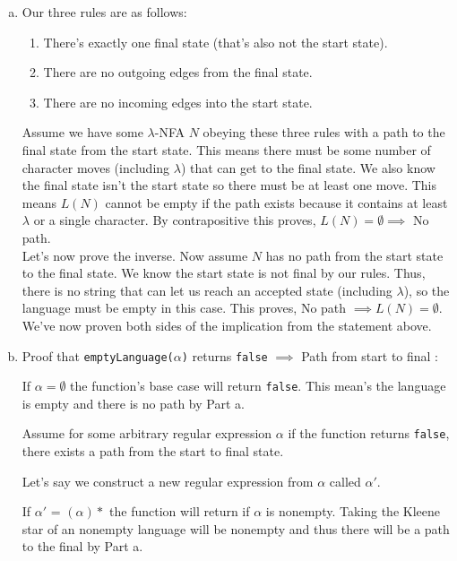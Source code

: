 \documentclass[12pt]{article}
\begin{document}
\begin{enumerate}[(a)]
    \item  Our three rules are as follows:

\begin{enumerate}[1.)]
	\item There's exactly one final state (that's also not the start state).
	\item There are no outgoing edges from the final state.
	\item There are no incoming edges into the start state.
\end{enumerate}

    	Assume we have some $\lambda$-NFA $N$ obeying these three rules with a path to the final state from the start state. This means there must be some number of character moves (including $\lambda$) that can get to the final state. We also know the final state isn't the start state so there must be at least one move. This means $L(N)$ cannot be empty if the path exists because it contains at least $\lambda$ or a single character. By contrapositive this proves, $L(N) = \emptyset \implies $ No path. \\ 

Let's now prove the inverse. Now assume $N$ has no path from the start state to the final state. We know the start state is not final by our rules. Thus, there is no string that can let us reach an accepted state (including $\lambda$), so the language must be empty in this case. This proves, No path $\implies L(N) = \emptyset$. We've now proven both sides of the implication from the statement above.

\item Proof that \texttt{emptyLanguage($\alpha$)} returns \texttt{false} $\implies$ Path from start to final :

If $\alpha = \emptyset$ the function's base case will return \texttt{false}. This mean's the language is empty and there is no path by Part a.

Assume for some arbitrary regular expression $\alpha$ if the function returns \texttt{false}, there exists a path from the start to final state.

Let's say we construct a new regular expression from $\alpha$ called $\alpha '$. 

If $\alpha '$ = $(\alpha )*$ the function will return  if $\alpha$ is nonempty. Taking the Kleene star of an nonempty language will be nonempty and thus there will be a path to the final by Part a.


\end{enumerate}
\end{document}
